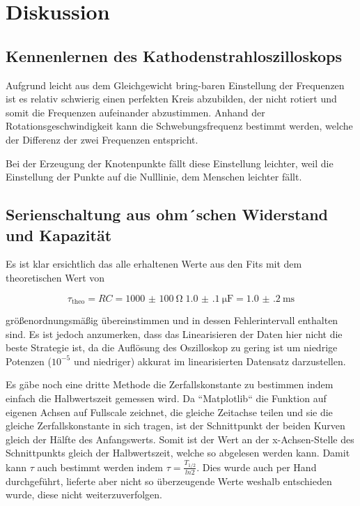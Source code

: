 \documentclass[11pt,ngerman]{scrartcl}
\begin{document}
\newpage

\section{Diskussion}\label{disk}

\subsection{Kennenlernen des Kathodenstrahloszilloskops}

Aufgrund leicht aus dem Gleichgewicht bring-baren Einstellung der Frequenzen
ist es relativ schwierig einen perfekten Kreis abzubilden, der nicht rotiert
und somit die Frequenzen aufeinander abzustimmen. Anhand der
Rotationsgeschwindigkeit kann die Schwebungsfrequenz bestimmt werden, welche
der Differenz der zwei Frequenzen entspricht.

Bei der Erzeugung der Knotenpunkte fällt diese Einstellung leichter, weil die
Einstellung der Punkte auf die Nulllinie, dem Menschen leichter fällt.

\subsection{Serienschaltung aus ohm´schen Widerstand und Kapazität}

Es ist klar ersichtlich das alle erhaltenen Werte aus den Fits mit dem theoretischen Wert von

\begin{equation}
	\tau_{\text{theo}} = RC = \SI{1000(100)}{\ohm} \; \SI{1.0(1)}{\micro\farad} = \SI{1.0(2)}{\ms}
	\label{eq:tautheo}
\end{equation}

größenordnungsmäßig übereinstimmen und in dessen Fehlerintervall
enthalten sind. Es ist jedoch anzumerken, dass das Linearisieren der Daten
hier nicht die beste Strategie ist, da die Auflösung des Oszilloskop zu gering
ist um niedrige Potenzen ($10^{-5}$ und niedriger) akkurat im linearisierten
Datensatz darzustellen.

Es gäbe noch eine dritte Methode die Zerfallskonstante zu bestimmen indem einfach die
Halbwertszeit gemessen wird. Da ``Matplotlib`` die Funktion auf eigenen
Achsen auf Fullscale zeichnet, die gleiche Zeitachse teilen und sie die gleiche
Zerfallskonstante in sich tragen, ist der Schnittpunkt der beiden Kurven gleich
der Hälfte des Anfangswerts. Somit ist der Wert an der x-Achsen-Stelle des
Schnittpunkts gleich der Halbwertszeit, welche so abgelesen werden kann. Damit kann $\tau$ auch
bestimmt werden indem $\tau = \frac{T_{1/2}}{ln{2}}$. Dies wurde auch per Hand
durchgeführt, lieferte aber nicht so überzeugende Werte weshalb entschieden wurde, diese nicht weiterzuverfolgen.
\end{document}
